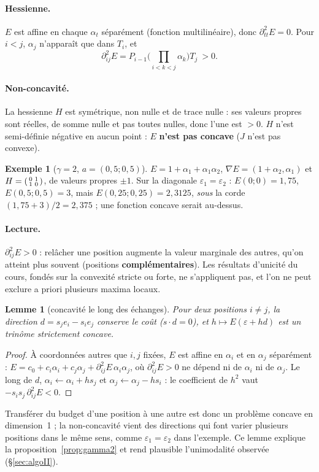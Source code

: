 \documentclass[11pt,a4paper]{article}
\theoremstyle{plain}
\newtheorem{lemme}{Lemme}
\theoremstyle{definition}
\newtheorem{exemple}{Exemple}
\begin{document}
\paragraph{Hessienne.} $E$ est affine en chaque $\alpha_t$ séparément (fonction multilinéaire), donc $\partial^2_{tt}E=0$. Pour $i<j$, $\alpha_j$ n'apparaît que dans $T_i$, et
\[\partial^2_{ij}E=P_{i-1}\Big(\prod_{i<k<j}\alpha_k\Big)T_j\ >0.\]

\paragraph{Non-concavité.} La hessienne $H$ est symétrique, non nulle et de trace nulle : ses valeurs propres sont réelles, de somme nulle et pas toutes nulles, donc l'une est $>0$. $H$ n'est semi-définie négative en aucun point : $E$ \textbf{n'est pas concave} ($J$ n'est pas convexe).

\begin{exemple}[$\gamma=2$, $a=(0{,}5;0{,}5)$]
$E=1+\alpha_1+\alpha_1\alpha_2$, $\nabla E=(1+\alpha_2,\alpha_1)$ et $H=\begin{psmallmatrix}0&1\\1&0\end{psmallmatrix}$, de valeurs propres $\pm1$. Sur la diagonale $\varepsilon_1=\varepsilon_2$ : $E(0;0)=1{,}75$, $E(0{,}5;0{,}5)=3$, mais $E(0{,}25;0{,}25)=2{,}3125$, \emph{sous} la corde $(1{,}75+3)/2=2{,}375$ ; une fonction concave serait au-dessus.
\end{exemple}

\paragraph{Lecture.} $\partial^2_{ij}E>0$ : relâcher une position augmente la valeur marginale des autres, qu'on atteint plus souvent (positions \textbf{complémentaires}). Les résultats d'unicité du cours, fondés sur la convexité stricte ou forte, ne s'appliquent pas, et l'on ne peut exclure a priori plusieurs maxima locaux.

\begin{lemme}[concavité le long des échanges]\label{lem:echange}
Pour deux positions $i\ne j$, la direction $d=s_je_i-s_ie_j$ conserve le coût ($s\cdot d=0$), et $h\mapsto E(\varepsilon+hd)$ est un trinôme strictement concave.
\end{lemme}
\begin{proof}
À coordonnées autres que $i,j$ fixées, $E$ est affine en $\alpha_i$ et en $\alpha_j$ séparément : $E=c_0+c_i\alpha_i+c_j\alpha_j+\partial^2_{ij}E\,\alpha_i\alpha_j$, où $\partial^2_{ij}E>0$ ne dépend ni de $\alpha_i$ ni de $\alpha_j$. Le long de $d$, $\alpha_i\leftarrow\alpha_i+hs_j$ et $\alpha_j\leftarrow\alpha_j-hs_i$ : le coefficient de $h^2$ vaut $-s_is_j\,\partial^2_{ij}E<0$.
\end{proof}
Transférer du budget d'une position à une autre est donc un problème concave en dimension~1 ; la non-concavité vient des directions qui font varier plusieurs positions dans le même sens, comme $\varepsilon_1=\varepsilon_2$ dans l'exemple. Ce lemme explique la proposition~\ref{prop:gamma2} et rend plausible l'unimodalité observée (§\ref{sec:algoII}).
\end{document}

